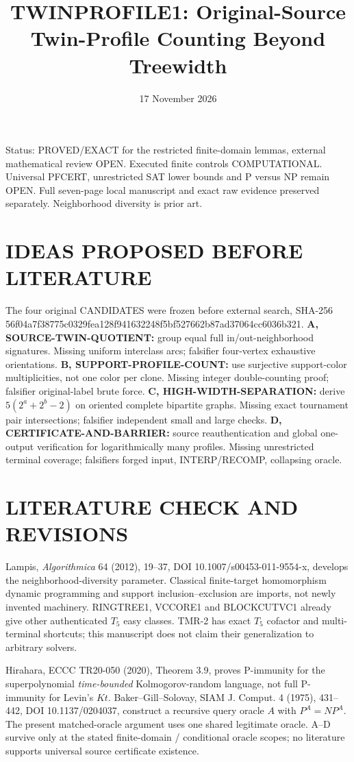 \documentclass[11pt]{article}
\title{TWINPROFILE1: Original-Source Twin-Profile Counting Beyond Treewidth}
\date{17 November 2026}
\begin{document}
\maketitle
\noindent Status: PROVED/EXACT for the restricted finite-domain lemmas, external mathematical review OPEN. Executed finite controls COMPUTATIONAL. Universal PFCERT, unrestricted SAT lower bounds and P versus NP remain OPEN. Full seven-page local manuscript and exact raw evidence preserved separately. Neighborhood diversity is prior art.

\section{IDEAS PROPOSED BEFORE LITERATURE}
The four original CANDIDATES were frozen before external search, SHA-256 56f04a7f38775c0329fea128f941632248f5bf527662b87ad37064cc6036b321.
\textbf{A, SOURCE-TWIN-QUOTIENT:} group equal full in/out-neighborhood signatures. Missing uniform interclass arcs; falsifier four-vertex exhaustive orientations.
\textbf{B, SUPPORT-PROFILE-COUNT:} use surjective support-color multiplicities, not one color per clone. Missing integer double-counting proof; falsifier original-label brute force.
\textbf{C, HIGH-WIDTH-SEPARATION:} derive $5(2^a+2^b-2)$ on oriented complete bipartite graphs. Missing exact tournament pair intersections; falsifier independent small and large checks.
\textbf{D, CERTIFICATE-AND-BARRIER:} source reauthentication and global one-output verification for logarithmically many profiles. Missing unrestricted terminal coverage; falsifiers forged input, INTERP/RECOMP, collapsing oracle.

\section{LITERATURE CHECK AND REVISIONS}
Lampis, \emph{Algorithmica} 64 (2012), 19--37, DOI 10.1007/s00453-011-9554-x, develops the neighborhood-diversity parameter. Classical finite-target homomorphism dynamic programming and support inclusion--exclusion are imports, not newly invented machinery. RINGTREE1, VCCORE1 and BLOCKCUTVC1 already give other authenticated $T_5$ easy classes. TMR-2 has exact $T_5$ cofactor and multi-terminal shortcuts; this manuscript does not claim their generalization to arbitrary solvers.

Hirahara, ECCC TR20-050 (2020), Theorem 3.9, proves P-immunity for the superpolynomial \emph{time-bounded} Kolmogorov-random language, not full P-immunity for Levin's $Kt$. Baker--Gill--Solovay, SIAM J. Comput. 4 (1975), 431--442, DOI 10.1137/0204037, construct a recursive query oracle $A$ with $P^A=NP^A$. The present matched-oracle argument uses one shared legitimate oracle. A--D survive only at the stated finite-domain / conditional oracle scopes; no literature supports universal source certificate existence.
\end{document}
